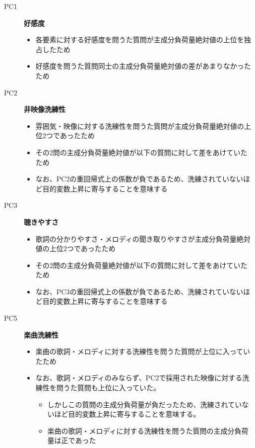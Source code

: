 \documentclass[11pt,a4paper, uplatex]{jsarticle}
\begin{document}
\begin{description}
  \item[PC1] {\bf 好感度}
  \begin{itemize}
    \item 各要素に対する好感度を問うた質問が主成分負荷量絶対値の上位を独占したため
    \item 好感度を問うた質問同士の主成分負荷量絶対値の差があまりなかったため
  \end{itemize}

  \item[PC2] {\bf 非映像洗練性}
  \begin{itemize}
    \item 雰囲気・映像に対する洗練性を問うた質問が主成分負荷量絶対値の上位2つであったため
    \item その2問の主成分負荷量絶対値が以下の質問に対して差をあけていたため
    \item なお、PC2の重回帰式上の係数が負であるため、洗練されていないほど目的変数上昇に寄与することを意味する
  \end{itemize}

  \item[PC3] {\bf 聴きやすさ}
  \begin{itemize}
    \item 歌詞の分かりやすさ・メロディの聞き取りやすさが主成分負荷量絶対値の上位2つであったため
    \item その2問の主成分負荷量絶対値が以下の質問に対して差をあけていたため
    \item なお、PC3の重回帰式上の係数が負であるため、洗練されていないほど目的変数上昇に寄与することを意味する
  \end{itemize}

  \item[PC5] {\bf 楽曲洗練性}
  \begin{itemize}
    \item 楽曲の歌詞・メロディに対する洗練性を問うた質問が上位に入っていたため
    \item なお、歌詞・メロディのみならず、PC2で採用された映像に対する洗練性を問うた質問も上位に入っていた。
    \begin{itemize}
      \item しかしこの質問の主成分負荷量が負だったため、洗練されていないほど目的変数上昇に寄与することを意味する。
      \item 楽曲の歌詞・メロディに対する洗練性を問うた質問の主成分負荷量は正であった
    \end{itemize}
  \end{itemize}


\end{description}
\end{document}
